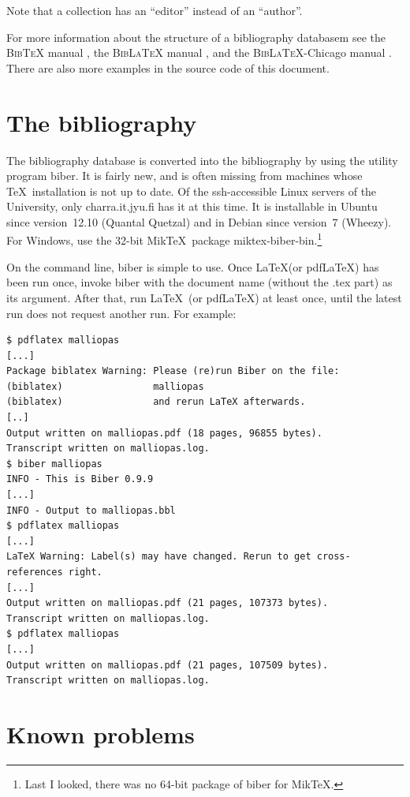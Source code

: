 \documentclass[utf8,english]{gradu3}
\begin{document}
Note that a collection has an ``editor'' instead of an ``author''.

For more information about the structure of a bibliography databasem
see the \textsc{Bib\TeX} manual \parencite{bibtexing},
the \textsc{Bib\LaTeX} manual \parencite[Section~2]{biblatex-manual},
and the \textsc{Bib\LaTeX}-Chicago manual
\parencite[Sections 5.1--5.2]{biblatex-chicago-manual}.  There are
also more examples in the source code of this document.


\section{The bibliography}

The bibliography database is converted into the bibliography by using
the utility program {biber}.  It is fairly new, and is often missing
from machines whose \TeX\ installation is not up to date.  Of the
ssh-accessible Linux servers of the University, only charra.it.jyu.fi
has it at this time.  It is installable in Ubuntu since version~12.10
(Quantal Quetzal) and in Debian since version~7 (Wheezy).  For
Windows, use the 32-bit Mik\TeX\ package
miktex-biber-bin.\footnote{Last I looked, there was no 64-bit package
  of biber for Mik\TeX.}

On the command line, biber is simple to use.  Once \LaTeX (or
pdf\LaTeX) has been run once, invoke biber with the document name
(without the .tex part) as its argument.  After that, run \LaTeX\ (or
pdf\LaTeX) at least once, until the latest run does not request
another run.  For example:

\begingroup\footnotesize
\begin{verbatim}
$ pdflatex malliopas
[...]
Package biblatex Warning: Please (re)run Biber on the file:
(biblatex)                malliopas
(biblatex)                and rerun LaTeX afterwards.
[..]
Output written on malliopas.pdf (18 pages, 96855 bytes).
Transcript written on malliopas.log.
$ biber malliopas
INFO - This is Biber 0.9.9
[...]
INFO - Output to malliopas.bbl
$ pdflatex malliopas
[...]
LaTeX Warning: Label(s) may have changed. Rerun to get cross-references right.
[...]
Output written on malliopas.pdf (21 pages, 107373 bytes).
Transcript written on malliopas.log.
$ pdflatex malliopas
[...]
Output written on malliopas.pdf (21 pages, 107509 bytes).
Transcript written on malliopas.log.
\end{verbatim}
\endgroup

\section{Known problems}
\end{document}
